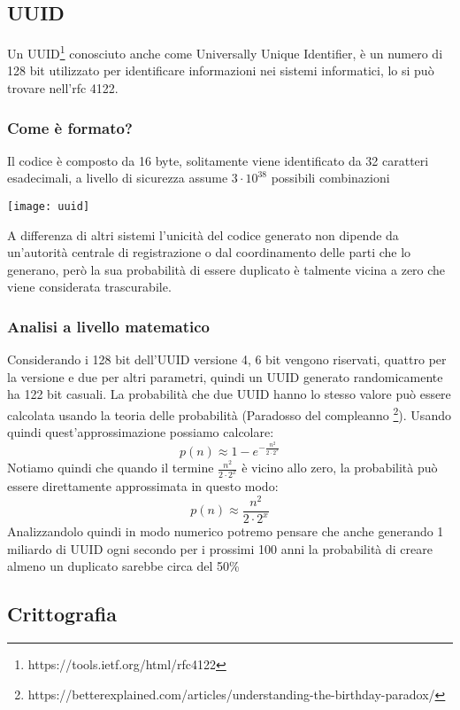 \subsection{UUID}
Un UUID\footnote{https://tools.ietf.org/html/rfc4122} conosciuto anche come Universally Unique Identifier, è un numero di 128 bit utilizzato per identificare informazioni nei sistemi informatici, lo si può trovare nell'rfc 4122.
\subsubsection{Come è formato?}
Il codice è composto da 16 byte, solitamente viene identificato da 32 caratteri esadecimali, a livello di sicurezza assume $ 3 \cdot 10^{38}$ possibili combinazioni
\begin{center}
\texttt{[image: uuid]}
\end{center}
A differenza di altri sistemi l'unicità del codice generato non dipende da un'autorità centrale di registrazione o dal coordinamento delle parti che lo generano, però la sua probabilità di essere duplicato è talmente vicina a zero che viene considerata trascurabile.

\subsubsection{Analisi a livello matematico}

Considerando i 128 bit dell'UUID versione 4, 6 bit vengono riservati, quattro per la versione e due per altri parametri, quindi un UUID generato randomicamente ha 122 bit casuali. La probabilità che due UUID hanno lo stesso valore può essere calcolata usando la teoria delle probabilità (Paradosso del compleanno \footnote{https://betterexplained.com/articles/understanding-the-birthday-paradox/}). Usando quindi quest'approssimazione possiamo calcolare:
\begin{equation}
p(n) \approx 1- e^{-\frac{n^2}{2\cdot 2^x}}
\end{equation}
Notiamo quindi che quando il termine $ \frac{n^2}{2\cdot 2^x}$ è vicino allo zero, la probabilità può essere direttamente approssimata in questo modo:
\begin{equation}
p(n) \approx \frac{n^2}{2\cdot 2^x}
\end{equation}
Analizzandolo quindi in modo numerico potremo pensare che anche generando 1 miliardo di UUID ogni secondo per i prossimi 100 anni la probabilità di creare almeno un duplicato sarebbe circa del 50\%

\subsection{Crittografia}